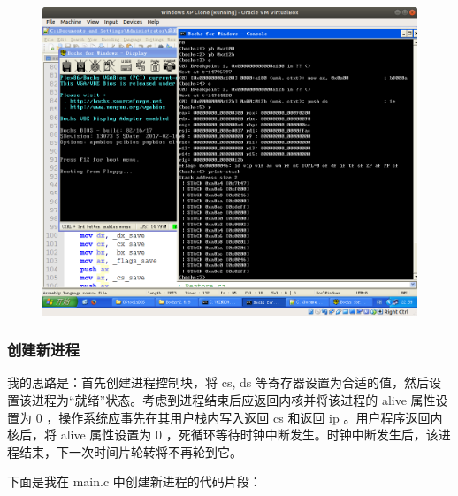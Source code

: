 \documentclass{article}
\begin{document}
\begin{figure}[!hbp]
	\centering
	\includegraphics[scale=0.4]{pics/2.png}
\end{figure}

\subsubsection{创建新进程}

我的思路是：首先创建进程控制块，将 cs, ds 等寄存器设置为合适的值，然后设置该进程为“就绪”状态。考虑到进程结束后应返回内核并将该进程的 alive 属性设置为 0 ，操作系统应事先在其用户栈内写入返回 cs 和返回 ip 。用户程序返回内核后，将 alive 属性设置为 0 ，死循环等待时钟中断发生。时钟中断发生后，该进程结束，下一次时间片轮转将不再轮到它。

下面是我在 main.c 中创建新进程的代码片段：
\end{document}
